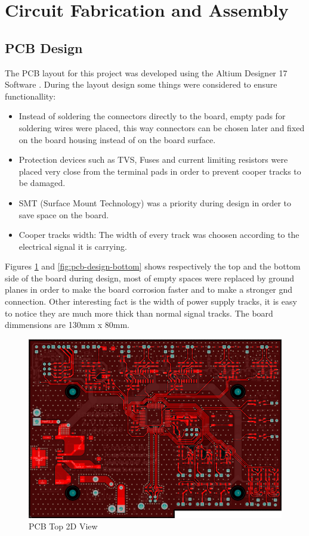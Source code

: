 \section{Circuit Fabrication and Assembly}\label{sec:printed-circuit-board}

	\subsection{PCB Design}\label{ssec:pcb-design}

		The PCB layout for this project was developed using the Altium Designer 17 Software \cite{AD17}. During the layout design some things were considered to ensure functionallity:

		\begin{itemize}
			\item Instead of soldering the connectors directly to the board, empty pads for soldering wires were placed, this way connectors can be chosen later and fixed on the board housing instead of on the board surface.\label{itm:pcb-pin-bars}
			\item Protection devices such as TVS, Fuses and current limiting resistors were placed very close from the terminal pads in order to prevent cooper tracks to be damaged.\label{itm:pcb-protection}
			\item SMT (Surface Mount Technology) was a priority during design in order to save space on the board.\label{itm:pcb-smt}
			\item Cooper tracks width: The width of every track was choosen according to the electrical signal it is carrying.\label{itm:pcb-track}
 		\end{itemize}

 		Figures \ref{fig:pcb-design-top} and \ref{fig:pcb-design-bottom} shows respectively the top and the bottom side of the board during design, most of empty spaces were replaced by ground planes in order to make the board corrosion faster and to make a stronger gnd connection. Other interesting fact is the width of power supply tracks, it is easy to notice they are much more thick than normal signal tracks. The board dimmensions are 130mm x 80mm.

		\begin{figure}[htbp]
			\centering
			\includegraphics[width=.8\textwidth]{figuras/fig-pcb-design-top}
			\caption{PCB Top 2D View}
			\label{fig:pcb-design-top}
		\end{figure}

